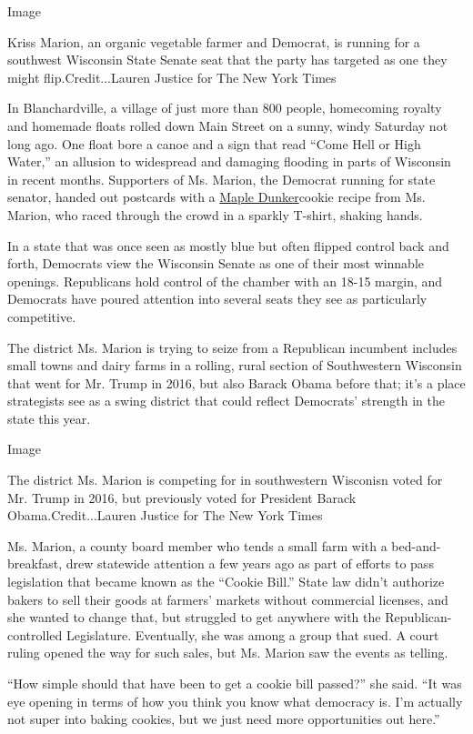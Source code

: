 Image

Kriss Marion, an organic vegetable farmer and Democrat, is running for a
southwest Wisconsin State Senate seat that the party has targeted as one
they might flip.Credit...Lauren Justice for The New York Times

In Blanchardville, a village of just more than 800 people, homecoming
royalty and homemade floats rolled down Main Street on a sunny, windy
Saturday not long ago. One float bore a canoe and a sign that read
``Come Hell or High Water,'' an allusion to widespread and damaging
flooding in parts of Wisconsin in recent months. Supporters of Ms.
Marion, the Democrat running for state senator, handed out postcards
with a
\href{https://www.cbsnews.com/news/wisconsin-recipes-maple-dunkers/}{Maple
Dunker}cookie recipe from Ms. Marion, who raced through the crowd in a
sparkly T-shirt, shaking hands.

In a state that was once seen as mostly blue but often flipped control
back and forth, Democrats view the Wisconsin Senate as one of their most
winnable openings. Republicans hold control of the chamber with an 18-15
margin, and Democrats have poured attention into several seats they see
as particularly competitive.

The district Ms. Marion is trying to seize from a Republican incumbent
includes small towns and dairy farms in a rolling, rural section of
Southwestern Wisconsin that went for Mr. Trump in 2016, but also Barack
Obama before that; it's a place strategists see as a swing district that
could reflect Democrats' strength in the state this year.

Image

The district Ms. Marion is competing for in southwestern Wisconisn voted
for Mr. Trump in 2016, but previously voted for President Barack
Obama.Credit...Lauren Justice for The New York Times

Ms. Marion, a county board member who tends a small farm with a
bed-and-breakfast, drew statewide attention a few years ago as part of
efforts to pass legislation that became known as the ``Cookie Bill.''
State law didn't authorize bakers to sell their goods at farmers'
markets without commercial licenses, and she wanted to change that, but
struggled to get anywhere with the Republican-controlled Legislature.
Eventually, she was among a group that sued. A court ruling opened the
way for such sales, but Ms. Marion saw the events as telling.

``How simple should that have been to get a cookie bill passed?'' she
said. ``It was eye opening in terms of how you think you know what
democracy is. I'm actually not super into baking cookies, but we just
need more opportunities out here.''

